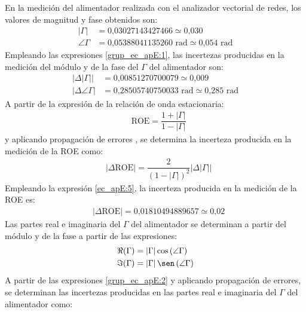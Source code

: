 En la medición del alimentador realizada con el analizador vectorial de redes, los valores de magnitud y fase obtenidos son:
\begin{align*}
\left|\Gamma\right| &= \text{0,03027143427466} \simeq \text{0,030}\\
\angle\Gamma &= \text{0,05388041135260 rad} \simeq \text{0,054 rad}
\end{align*}
Empleando las expresiones \eqref{grup_ec_apE:1}, las incertezas producidas en la medición del módulo y de la fase del $\Gamma$ del alimentador son:
\begin{align*}
\left|\Delta\left|\Gamma\right|\right| &= \text{0,00851270700079} \simeq \text{0,009}\\
\left|\Delta\angle\Gamma\right| &= \text{0,28505740750033 rad} \simeq \text{0,285 rad}
\end{align*}
A partir de la expresión de la relación de onda estacionaria:
\begin{align}
&\text{ROE} = \dfrac{1 + \left|\Gamma\right|}{1 - \left|\Gamma\right|}
\label{ec_apE:4}
\end{align}
y aplicando propagación de errores \cite{walfram_error_prop}, se determina la incerteza producida en la medición de la ROE como:
\begin{align}
&\left|\Delta\text{ROE}\right| = \dfrac{2}{\left(1 - \left|\Gamma\right|\right)^2}\left|\Delta\left|\Gamma\right|\right|
\label{ec_apE:5}
\end{align}
Empleando la expresión \eqref{ec_apE:5}, la incerteza producida en la medición de la ROE es:
\begin{align*}
&\left|\Delta\text{ROE}\right| = \text{0,01810494889657} \simeq \text{0,02}
\end{align*}
Las partes real e imaginaria del $\Gamma$ del alimentador se determinan a partir del módulo y de la fase a partir de las expresiones:
\begin{subequations}
\label{grup_ec_apE:2}
\begin{align}
\Re\!\left(\Gamma\right) &= \left|\Gamma\right|\cos\left(\angle\Gamma\right)
\label{ec_apE:6}\\
\Im\!\left(\Gamma\right) &= \left|\Gamma\right|\sen\left(\angle\Gamma\right)
\label{ec_apE:7}
\end{align}
\end{subequations}
A partir de las expresiones \eqref{grup_ec_apE:2} y aplicando propagación de errores, se determinan las incertezas producidas en las partes real e imaginaria del $\Gamma$ del alimentador como:
